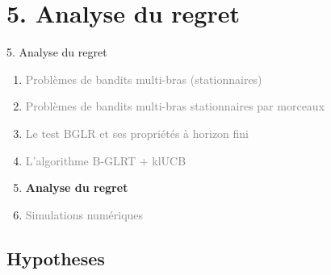 \documentclass[11pt,french,ignorenonframetext,]{beamer}
\begin{document}
\section{\hfill{}5. Analyse du regret\hfill{}}

\begin{frame}{5. Analyse du regret}

  \begin{enumerate}
    \item
    \textcolor{gray}{
      Problèmes de bandits multi-bras (stationnaires)
    }
    \vspace*{15pt}

    \item
    \textcolor{gray}{
      Problèmes de bandits multi-bras stationnaires par morceaux
    }
    \vspace*{15pt}

    \item
    \textcolor{gray}{
      Le test BGLR et ses propriétés à horizon fini
    }
    \vspace*{15pt}

    \item
    \textcolor{gray}{
      L'algorithme B-GLRT + klUCB
    }
    \vspace*{15pt}

    \item
    \alert{\textbf{%
      Analyse du regret
    }}
    \vspace*{15pt}

    \item
    \textcolor{gray}{
      Simulations numériques
    }
  \end{enumerate}

\end{frame}

\subsection{\hfill{}Hypotheses\hfill{}}
\end{document}
